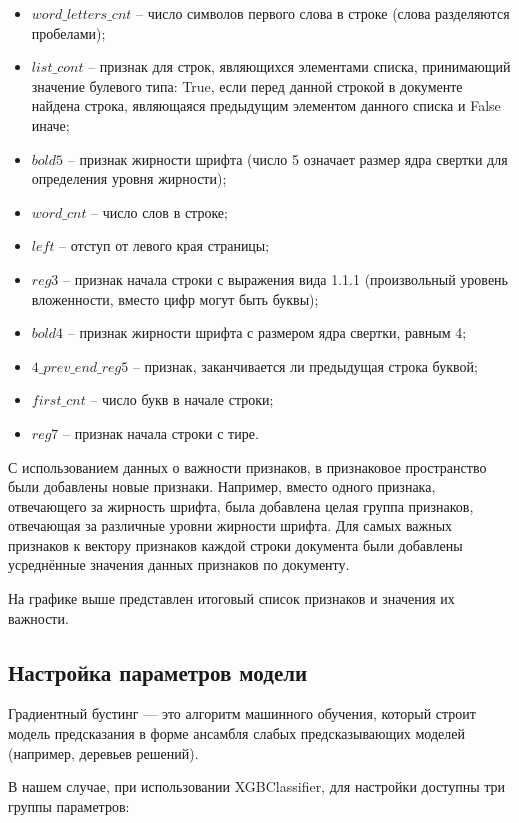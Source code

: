 \documentclass[a4paper,12pt]{article}
\begin{document}
\begin{itemize}

	\item $word\_letters\_cnt$ -- число символов первого слова в строке (слова разделяются пробелами);
	\item $list\_cont$ -- признак для строк, являющихся элементами списка, принимающий значение булевого типа: True, если перед данной строкой в документе найдена строка, являющаяся предыдущим элементом данного списка и False иначе;
	\item $bold5$ -- признак жирности шрифта (число 5 означает размер ядра свертки для определения уровня жирности);
	\item $word\_cnt$ -- число слов в строке;
	\item $left$ -- отступ от левого края страницы;
	\item $reg3$ -- признак начала строки с выражения вида 1.1.1 (произвольный уровень вложенности, вместо цифр могут быть буквы);
	\item $bold4$ -- признак жирности шрифта с размером ядра свертки, равным 4;
	\item $4\_prev\_end\_reg5$ -- признак, заканчивается ли предыдущая строка буквой;
	\item $first\_cnt$ -- число букв в начале строки;
	\item $reg7$ -- признак начала строки с тире.

\end{itemize}

С использованием данных о важности признаков, в признаковое пространство были добавлены новые признаки. Например, вместо одного признака, отвечающего за жирность шрифта, была добавлена целая группа признаков, отвечающая за различные уровни жирности шрифта. Для самых важных признаков к вектору признаков каждой строки документа были добавлены усреднённые значения данных признаков по документу.

На графике выше представлен итоговый список признаков и значения их важности.

\subsection{Настройка параметров модели}

Градиентный бустинг — это алгоритм машинного обучения, который строит модель предсказания в форме ансамбля слабых предсказывающих моделей (например, деревьев решений).

В нашем случае, при использовании XGBClassifier, для настройки доступны три группы параметров:
\end{document}
